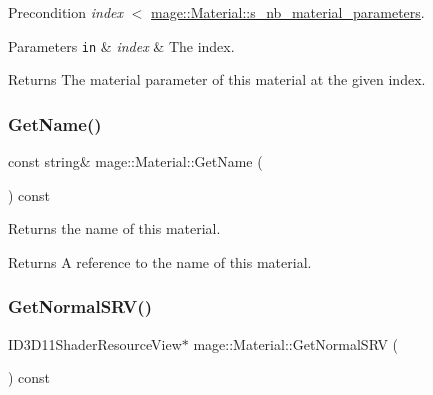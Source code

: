 \begin{DoxyPrecond}{Precondition}
{\itshape index} $<$ \hyperlink{structmage_1_1_material_a06d6d7b7243ea8acce9445b501816d78}{mage\+::\+Material\+::s\+\_\+nb\+\_\+material\+\_\+parameters}. 
\end{DoxyPrecond}

\begin{DoxyParams}[1]{Parameters}
\mbox{\tt in}  & {\em index} & The index. \\
\hline
\end{DoxyParams}
\begin{DoxyReturn}{Returns}
The material parameter of this material at the given index. 
\end{DoxyReturn}
\hypertarget{structmage_1_1_material_a9edb2f437eca07c6c12c24d10ec30eb3}{}\label{structmage_1_1_material_a9edb2f437eca07c6c12c24d10ec30eb3} 
\subsubsection{\texorpdfstring{Get\+Name()}{GetName()}}
{\footnotesize\ttfamily const string\& mage\+::\+Material\+::\+Get\+Name (\begin{DoxyParamCaption}{ }\end{DoxyParamCaption}) const\hspace{0.3cm}{\ttfamily [noexcept]}}

Returns the name of this material.

\begin{DoxyReturn}{Returns}
A reference to the name of this material. 
\end{DoxyReturn}
\hypertarget{structmage_1_1_material_a0be98911c56dedaa4fd2f8714fc8a793}{}\label{structmage_1_1_material_a0be98911c56dedaa4fd2f8714fc8a793} 
\subsubsection{\texorpdfstring{Get\+Normal\+S\+R\+V()}{GetNormalSRV()}}
{\footnotesize\ttfamily I\+D3\+D11\+Shader\+Resource\+View$\ast$ mage\+::\+Material\+::\+Get\+Normal\+S\+RV (\begin{DoxyParamCaption}{ }\end{DoxyParamCaption}) const\hspace{0.3cm}{\ttfamily [noexcept]}}

